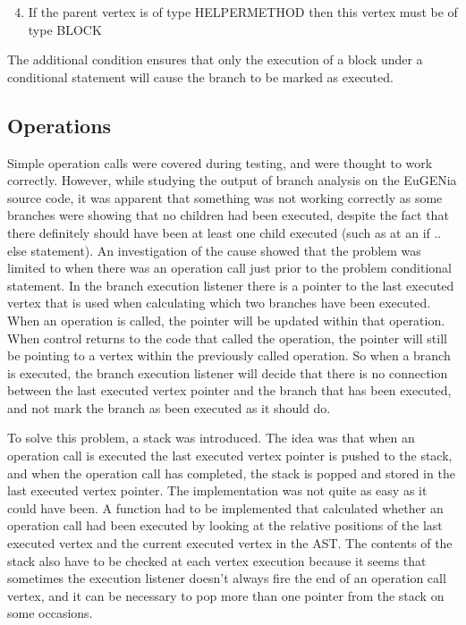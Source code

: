 \begin{enumerate}
\setcounter{enumi}{3}
\item If the parent vertex is of type HELPERMETHOD then this vertex must be of type BLOCK
\end{enumerate}

The additional condition ensures that only the execution of a block under a conditional statement will cause the branch to be marked as executed.

\subsection{Operations}

Simple operation calls were covered during testing, and were thought to work correctly. However, while studying the output of branch analysis on the EuGENia source code, it was apparent that something was not working correctly as some branches were showing that no children had been executed, despite the fact that there definitely should have been at least one child executed (such as at an if .. else statement). An investigation of the cause showed that the problem was limited to when there was an operation call just prior to the problem conditional statement. In the branch execution listener there is a pointer to the last executed vertex that is used when calculating which two branches have been executed. When an operation is called, the pointer will be updated within that operation. When control returns to the code that called the operation, the pointer will still be pointing to a vertex within the previously called operation. So when a branch is executed, the branch execution listener will decide that there is no connection between the last executed vertex pointer and the branch that has been executed, and not mark the branch as been executed as it should do.

To solve this problem, a stack was introduced. The idea was that when an operation call is executed the last executed vertex pointer is pushed to the stack, and when the operation call has completed, the stack is popped and stored in the last executed vertex pointer. The implementation was not quite as easy as it could have been. A function had to be implemented that calculated whether an operation call had been executed by looking at the relative positions of the last executed vertex and the current executed vertex in the AST. The contents of the stack also have to be checked at each vertex execution because it seems that sometimes the execution listener doesn't always fire the end of an operation call vertex, and it can be necessary to pop more than one pointer from the stack on some occasions. 

